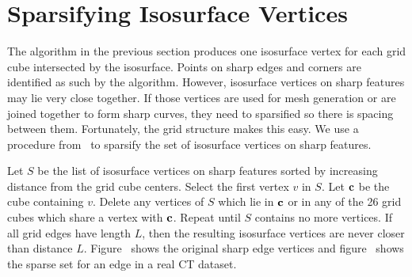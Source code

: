 
\section{Sparsifying Isosurface Vertices}
\label{sec:select_sharp}

The algorithm in the previous section produces one isosurface vertex
for each grid cube intersected by the isosurface.
Points on sharp edges and corners are identified 
as such by the algorithm.
However, isosurface vertices on sharp features
may lie very close together.
If those vertices are used for mesh generation
or are joined together to form sharp curves,
they need to sparsified so there is spacing between them.
Fortunately, the grid structure makes this easy.
We use a procedure from~\cite{bw-cisec-13}
to sparsify the set of isosurface vertices on sharp features.

Let $S$ be the list of isosurface vertices on sharp features
sorted by increasing distance from the grid cube centers.
Select the first vertex $v$ in $S$.
Let $\mathbf{c}$ be the cube containing $v$.
Delete any vertices of $S$ which lie in $\mathbf{c}$ 
or in any of the 26 grid cubes which share a vertex with $\mathbf{c}$.
Repeat until $S$ contains no more vertices.
If all grid edges have length $L$,
then the resulting isosurface vertices are never closer
than distance $L$.
Figure~ shows the original sharp edge vertices and figure~ shows the sparse set for an edge in a real CT dataset.




